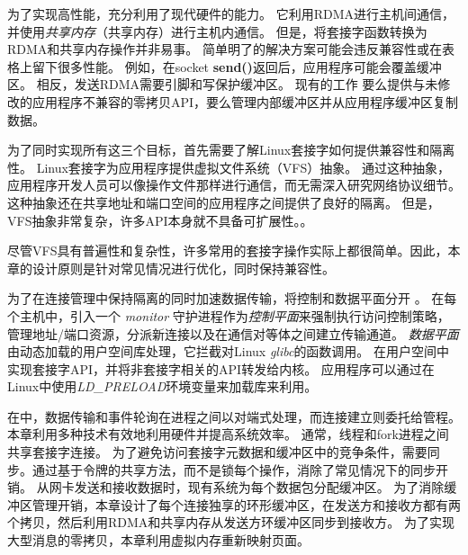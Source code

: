 为了实现高性能，\sys{}充分利用了现代硬件的能力。 它利用RDMA进行主机间通信，并使用\emph {共享内存}（共享内存）进行主机内通信。 但是，将套接字函数转换为RDMA和共享内存操作并非易事。 简单明了的解决方案可能会违反兼容性或在表格上留下很多性能。 例如，在socket \textbf {send()}返回后，应用程序可能会覆盖缓冲区。 相反，发送RDMA需要引脚和写保护缓冲区。 现有的工作 \cite {rsockets}要么提供与未修改的应用程序不兼容的零拷贝API，要么管理内部缓冲区并从应用程序缓冲区复制数据。

为了同时实现所有这三个目标，首先需要了解Linux套接字如何提供兼容性和隔离性。 Linux套接字为应用程序提供虚拟文件系统（VFS）抽象。 通过这种抽象，应用程序开发人员可以像操作文件那样进行通信，而无需深入研究网络协议细节。 这种抽象还在共享地址和端口空间的应用程序之间提供了良好的隔离。 但是，VFS抽象非常复杂，许多API本身就不具备可扩展性。\cite {clark1989analysis,boyd2010analysis,jeong2014mtcp}。

尽管VFS具有普遍性和复杂性，许多常用的套接字操作实际上都很简单。因此，本章的设计原则是针对常见情况进行优化，同时保持兼容性。

为了在连接管理中保持隔离的同时加速数据传输，\sys {}将控制和数据平面分开 \cite {peter2016arrakis}。
在每个主机中，引入一个 \emph {monitor} 守护进程作为\emph {控制平面}来强制执行访问控制策略，管理地址/端口资源，分派新连接以及在通信对等体之间建立传输通道。
\emph {数据平面}由动态加载的用户空间库\libipc {}处理，它拦截对Linux \emph {glibc}的函数调用。 \libipc {}在用户空间中实现套接字API，并将非套接字相关的API转发给内核。
应用程序可以通过在Linux中使用\emph {LD\_PRELOAD}环境变量来加载库来利用\libipc {}。


在\sys {}中，数据传输和事件轮询在进程之间以对端式处理，而连接建立则委托给管程。
本章利用多种技术有效地利用硬件并提高系统效率。
通常，线程和fork进程之间共享套接字连接。
为了避免访问套接字元数据和缓冲区中的竞争条件，需要同步。通过基于令牌的共享方法，而不是锁每个操作，消除了常见情况下的同步开销。
从网卡发送和接收数据时，现有系统为每个数据包分配缓冲区。
为了消除缓冲区管理开销，本章设计了每个连接独享的环形缓冲区，在发送方和接收方都有两个拷贝，然后利用RDMA和共享内存从发送方环缓冲区同步到接收方。
为了实现大型消息的零拷贝，本章利用虚拟内存重新映射页面。

